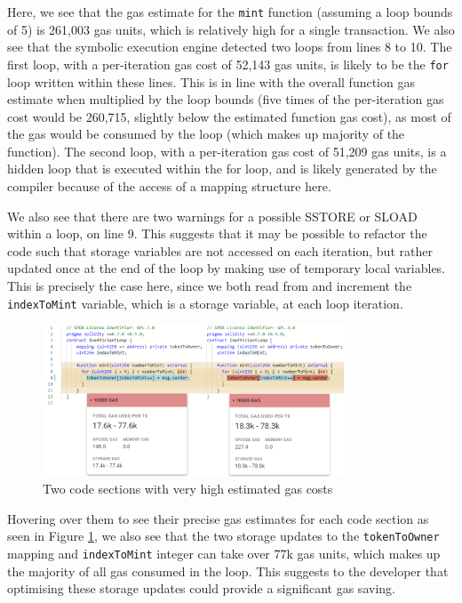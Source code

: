 Here, we see that the gas estimate for the
\texttt{mint} function (assuming a loop bounds of 5) is 261,003 gas units, which is
relatively high for a single transaction. We also see that the symbolic execution engine
detected two loops from lines 8 to 10. The first loop, with a per-iteration gas cost of
52,143 gas units, is likely to be the \texttt{for} loop written within these lines.
This is in line with the overall function gas estimate when multiplied by the loop bounds
(five times of the per-iteration gas cost would be 260,715, slightly below the estimated function gas cost), 
as most of the gas would be consumed by the loop (which makes up majority of the function).
The second loop, with a per-iteration gas cost of 51,209 gas units, is a hidden loop
that is executed within the for loop, and is likely generated by the compiler because
of the access of a mapping structure here.



We also see that there are two warnings for a possible SSTORE or SLOAD within a loop,
on line 9. This suggests that it may be possible to refactor the code such that
storage variables are not accessed on each iteration, but rather updated once
at the end of the loop by making use of temporary local variables.
This is precisely the case here, since we both read from and increment the 
\texttt{indexToMint} variable, which is a storage variable, at each loop iteration.

\begin{figure}[h]
  \centering
  \includegraphics[width=0.8\textwidth]{./figures/eval/case_gas}
  \caption{Two code sections with very high estimated gas costs}
  \label{fig:eval_case_gas}
\end{figure}

Hovering over them to see their precise gas estimates for each code section as seen 
in Figure \ref{fig:eval_case_gas}, we also
see that the two storage updates to the \texttt{tokenToOwner} mapping and 
\texttt{indexToMint} integer can take over 77k gas units, which makes up the majority
of all gas consumed in the loop. This suggests to the developer that optimising these
storage updates could provide a significant gas saving.


